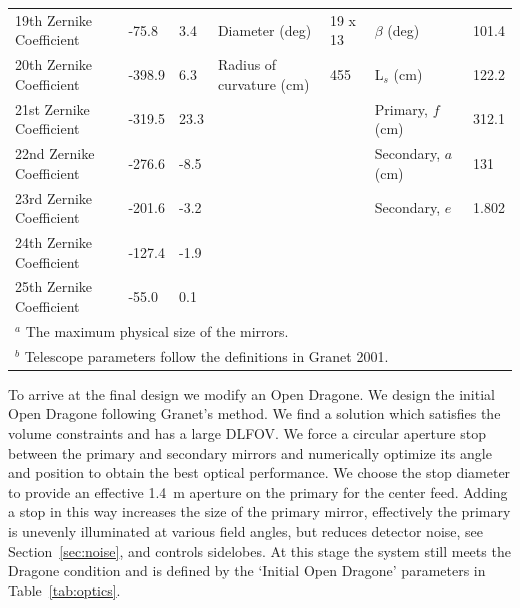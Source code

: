 \documentclass[]{spie}  %
\begin{document}
\begin{table}[ht]
\begin{adjustbox}{width=1.1\textwidth}
\begin{tabular}{|l|llll||ll|}
19th Zernike Coefficient  & -75.8             & 3.4               & Diameter (deg)            & 19 x 13  & $\beta$  (deg)                 & 101.4 \\   
20th Zernike Coefficient  & -398.9            & 6.3               & Radius of curvature (cm)  & 455      & L$_s$ (cm)                     & 122.2 \\   
21st Zernike Coefficient  & -319.5            & 23.3              &                           &          & Primary, $f$ (cm)              & 312.1 \\   
22nd Zernike Coefficient  & -276.6            & -8.5              &                           &          & Secondary, $a$ (cm)            & 131   \\   
23rd Zernike Coefficient  & -201.6            & -3.2              &                           &          & Secondary, $e$                 &  1.802  \\
24th Zernike Coefficient  & -127.4            & -1.9              &                           &          &                                &       \\
25th Zernike Coefficient  & -55.0             & 0.1               &                           &          &                                &       \\\hline
\multicolumn{7}{l}{\footnotesize  $^a$ The maximum physical size of the mirrors.}\\
\multicolumn{7}{l}{\footnotesize  $^b$ Telescope parameters follow the definitions in Granet 2001.\cite{granet2001}} \\
\end{tabular}
\end{adjustbox}
\end{table}

To arrive at the final design we modify an Open Dragone.  We design the initial Open Dragone following Granet's method\cite{granet2001}. 
We find a solution which satisfies the volume constraints and has a large DLFOV.  We force a circular aperture stop 
between the primary and secondary mirrors and numerically optimize its angle and position to obtain the best 
optical performance.  We choose the stop diameter to provide an effective 1.4~m aperture on the primary for the center feed.  
Adding a stop in this way increases the size of the primary mirror, effectively the primary is unevenly illuminated at various 
field angles, but reduces detector noise, see Section~\ref{sec:noise}, and controls sidelobes.  At this stage the system still meets 
the Dragone condition and is defined by the `Initial Open Dragone' parameters in Table~\ref{tab:optics}.
\end{document}
